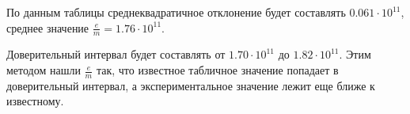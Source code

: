 По данным таблицы среднеквадратичное отклонение будет составлять $0.061\cdot10^{11}$, среднее значение $\frac{e}{m}=1.76\cdot10^{11}$.

Доверительный интервал будет составлять от $1.70\cdot10^{11}$ до $1.82\cdot10^{11}$. Этим методом нашли $\frac{e}{m}$ так, что известное табличное значение попадает в доверительный интервал, а экспериментальное значение лежит еще ближе к известному.


